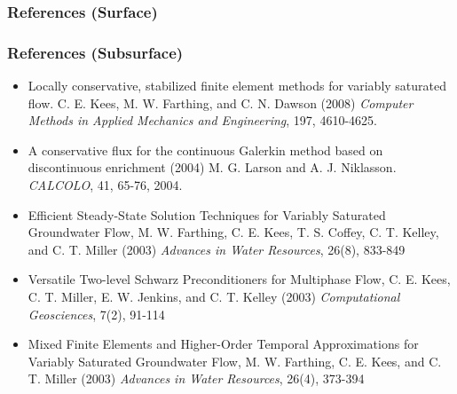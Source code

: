 \documentclass{beamer}
\begin{document}
\begin{frame}
\frametitle{References (Surface)}

\tiny{}
\end{frame}

\begin{frame}
  \frametitle{References (Subsurface)}
  \begin{footnotesize}
    \begin{itemize}
      
    \item Locally conservative, stabilized finite element methods for
      variably saturated flow. C. E. Kees, M. W. Farthing, and C. N.
      Dawson (2008) {\em Computer Methods in Applied Mechanics and
        Engineering}, 197, 4610-4625.
      
    \item A conservative flux for the continuous Galerkin method based
      on discontinuous enrichment (2004) M. G. Larson and
      A. J. Niklasson. {\em CALCOLO}, 41, 65-76, 2004.
      
    \item Efficient Steady-State Solution Techniques for Variably
      Saturated Groundwater Flow, M. W. Farthing, C. E. Kees,
      T. S. Coffey, C. T. Kelley, and C. T.  Miller (2003) {\em Advances
        in Water Resources}, 26(8), 833-849
      
    \item Versatile Two-level Schwarz Preconditioners for Multiphase Flow,
      C. E. Kees, C. T. Miller, E. W. Jenkins, and C. T. Kelley (2003)
      {\em Computational Geosciences}, 7(2), 91-114
      
    \item Mixed Finite Elements and Higher-Order Temporal Approximations
      for Variably Saturated Groundwater Flow, M. W. Farthing, C. E. Kees,
      and C. T. Miller (2003) {\em Advances in Water Resources}, 26(4),
      373-394
    \end{itemize}
  \end{footnotesize}
\end{frame}
\end{document}
